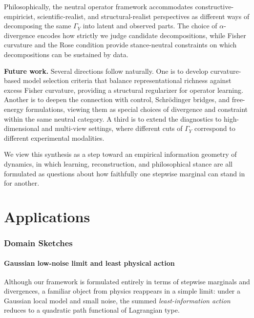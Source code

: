 \documentclass[11pt]{article}
\newcommand{\1}{\mathbf{1}}
\begin{document}
Philosophically, the neutral operator framework accommodates constructive-empiricist, scientific-realist, and structural-realist perspectives as different ways of decomposing the same $\Gamma_Y$ into latent and observed parts. The choice of $\alpha$-divergence encodes how strictly we judge candidate decompositions, while Fisher curvature and the Rose condition provide stance-neutral constraints on which decompositions can be sustained by data.

\medskip
\noindent
\textbf{Future work.}
Several directions follow naturally. One is to develop curvature-based model selection criteria that balance representational richness against excess Fisher curvature, providing a structural regularizer for operator learning. Another is to deepen the connection with control, Schrödinger bridges, and free-energy formulations, viewing them as special choices of divergence and constraint within the same neutral category. A third is to extend the diagnostics to high-dimensional and multi-view settings, where different cuts of $\Gamma_Y$ correspond to different experimental modalities.

We view this synthesis as a step toward an empirical information geometry of dynamics, in which learning, reconstruction, and philosophical stance are all formulated as questions about how faithfully one stepwise marginal can stand in for another.


\part{Applications}


\section{Domain Sketches}

\subsection{Gaussian low-noise limit and least physical action}

Although our framework is formulated entirely in terms of stepwise marginals and divergences, a familiar object from physics reappears in a simple limit: under a Gaussian local model and small noise, the summed \emph{least-information action} reduces to a quadratic path functional of Lagrangian type.
\end{document}

